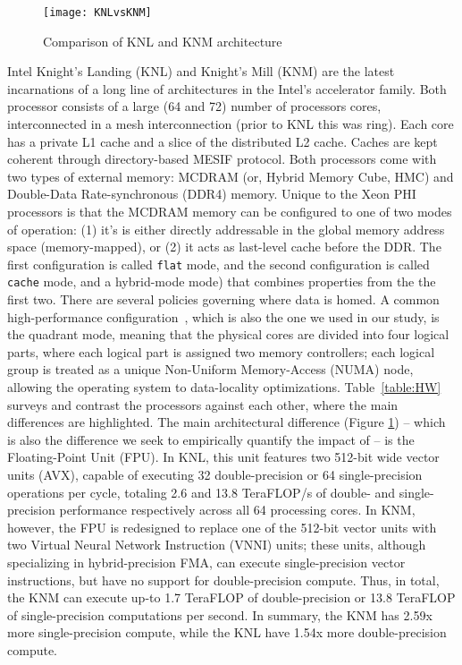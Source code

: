 \begin{figure}[tbp]
    \centering
    \texttt{[image: KNLvsKNM]}
    \caption{\label{fig:knlvsknm}Comparison of KNL and KNM architecture}
\end{figure}

Intel Knight’s Landing (KNL) and Knight’s Mill (KNM) are the latest incarnations of a long line of architectures in the Intel’s accelerator family. Both processor consists of a large (64 and 72) number of processors cores, interconnected in a mesh interconnection (prior to KNL this was ring). Each core has a private L1 cache and a slice of the distributed L2 cache. Caches are kept coherent through directory-based MESIF protocol.
Both processors come with two types of external memory: MCDRAM (or, Hybrid Memory Cube, HMC) and Double-Data Rate-synchronous (DDR4) memory. Unique to the Xeon PHI processors is that the MCDRAM memory can be configured to one of two modes of operation: (1) it’s is either directly addressable in the global memory address space (memory-mapped), or (2) it acts as last-level cache before the DDR. The first configuration is called \texttt{flat} mode, and the second configuration is called \texttt{cache} mode, and a hybrid-mode mode\cite{heinecke_high_2016}) that combines properties from the the first two.
There are several policies governing where data is homed. A common high-performance configuration~\cite{gawande_scaling_2017}, which is also the one we used in our study, is the quadrant mode, meaning that the physical cores are divided into four logical parts, where each logical part is assigned two memory controllers; each logical group is treated as a unique Non-Uniform Memory-Access (NUMA) node, allowing the operating system to data-locality optimizations.
Table~\ref{table:HW} surveys and contrast the processors against each other, where the main differences are highlighted. The main architectural difference (Figure \ref{fig:knlvsknm}) – which is also the difference we seek to empirically quantify the impact of – is the Floating-Point Unit (FPU). In KNL, this unit features two 512-bit wide vector units (AVX), capable of executing 32 double-precision or 64 single-precision operations per cycle, totaling 2.6 and 13.8 TeraFLOP/s of double- and single-precision performance respectively across all 64 processing cores. In KNM, however, the FPU is redesigned to replace one of the 512-bit vector units with two Virtual Neural Network Instruction (VNNI) units; these units, although specializing in hybrid-precision FMA, can execute single-precision vector instructions, but have no support for double-precision compute. Thus, in total, the KNM can execute up-to 1.7 TeraFLOP of double-precision or 13.8 TeraFLOP of single-precision computations per second. In summary, the KNM has 2.59x more single-precision compute, while the KNL have 1.54x more double-precision compute.
